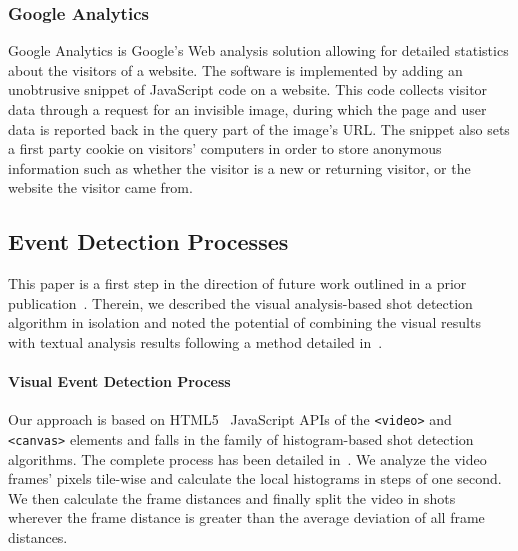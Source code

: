\documentclass[runningheads,a4paper]{llncs}
\begin{document}
\subsubsection{Google Analytics}
Google Analytics is Google's Web analysis solution allowing for detailed statistics about the visitors of a website. The software is implemented by adding an unobtrusive snippet of JavaScript code on a website. This code collects visitor data through a request for an invisible image, during which the page and user data is reported back in the query part of the image's URL. The snippet also sets a first party cookie on visitors' computers in order to store anonymous information such as whether the visitor is a new or returning visitor, or the website the visitor came from.

\subsection{Event Detection Processes}
This paper is a first step in the direction of future work outlined in a prior publication~\cite{artemis}. Therein, we described the visual analysis-based shot detection algorithm in isolation and noted the potential of combining the visual results with textual analysis results following a method detailed in~\cite{semwebvid}.

\paragraph{Visual Event Detection Process}
Our approach is based on HTML5~\cite{w3c_html5} JavaScript APIs of the \texttt{<video>} and \texttt{<canvas>} elements and falls in the family of histogram-based shot detection algorithms. The complete process has been detailed in~\cite{artemis}. We analyze the video frames' pixels tile-wise and calculate the local histograms in steps of one second. We then calculate the frame distances and finally split the video in shots wherever the frame distance is greater than the average deviation of all frame distances.
\end{document}
